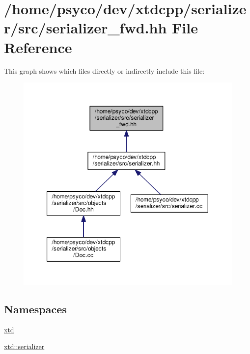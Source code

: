 \hypertarget{serializer__fwd_8hh}{}\section{/home/psyco/dev/xtdcpp/serializer/src/serializer\+\_\+fwd.hh File Reference}
\label{serializer__fwd_8hh}
This graph shows which files directly or indirectly include this file\+:
\nopagebreak
\begin{figure}[H]
\begin{center}
\leavevmode
\includegraphics[width=350pt]{serializer__fwd_8hh__dep__incl}
\end{center}
\end{figure}
\subsection*{Namespaces}
\begin{DoxyCompactItemize}
\item 
 \hyperlink{namespacextd}{xtd}
\item 
 \hyperlink{namespacextd_1_1serializer}{xtd\+::serializer}
\end{DoxyCompactItemize}
